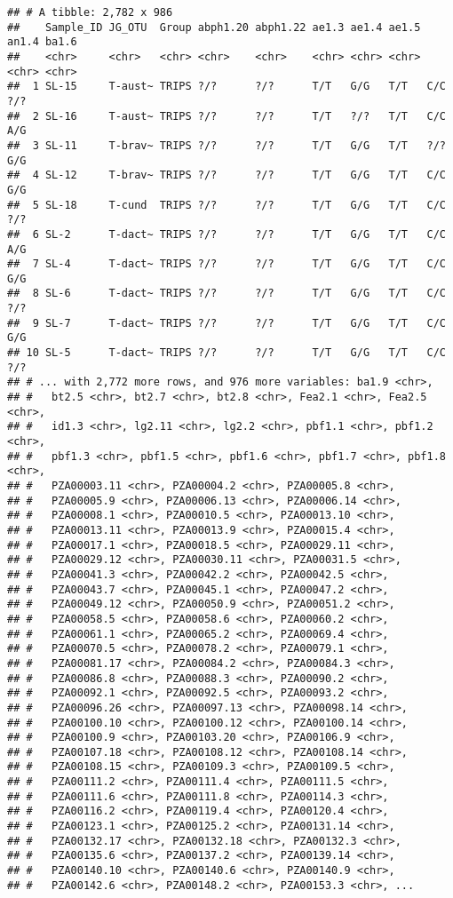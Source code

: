 \documentclass[]{article}
\begin{document}
\begin{verbatim}
## # A tibble: 2,782 x 986
##    Sample_ID JG_OTU  Group abph1.20 abph1.22 ae1.3 ae1.4 ae1.5 an1.4 ba1.6
##    <chr>     <chr>   <chr> <chr>    <chr>    <chr> <chr> <chr> <chr> <chr>
##  1 SL-15     T-aust~ TRIPS ?/?      ?/?      T/T   G/G   T/T   C/C   ?/?  
##  2 SL-16     T-aust~ TRIPS ?/?      ?/?      T/T   ?/?   T/T   C/C   A/G  
##  3 SL-11     T-brav~ TRIPS ?/?      ?/?      T/T   G/G   T/T   ?/?   G/G  
##  4 SL-12     T-brav~ TRIPS ?/?      ?/?      T/T   G/G   T/T   C/C   G/G  
##  5 SL-18     T-cund  TRIPS ?/?      ?/?      T/T   G/G   T/T   C/C   ?/?  
##  6 SL-2      T-dact~ TRIPS ?/?      ?/?      T/T   G/G   T/T   C/C   A/G  
##  7 SL-4      T-dact~ TRIPS ?/?      ?/?      T/T   G/G   T/T   C/C   G/G  
##  8 SL-6      T-dact~ TRIPS ?/?      ?/?      T/T   G/G   T/T   C/C   ?/?  
##  9 SL-7      T-dact~ TRIPS ?/?      ?/?      T/T   G/G   T/T   C/C   G/G  
## 10 SL-5      T-dact~ TRIPS ?/?      ?/?      T/T   G/G   T/T   C/C   ?/?  
## # ... with 2,772 more rows, and 976 more variables: ba1.9 <chr>,
## #   bt2.5 <chr>, bt2.7 <chr>, bt2.8 <chr>, Fea2.1 <chr>, Fea2.5 <chr>,
## #   id1.3 <chr>, lg2.11 <chr>, lg2.2 <chr>, pbf1.1 <chr>, pbf1.2 <chr>,
## #   pbf1.3 <chr>, pbf1.5 <chr>, pbf1.6 <chr>, pbf1.7 <chr>, pbf1.8 <chr>,
## #   PZA00003.11 <chr>, PZA00004.2 <chr>, PZA00005.8 <chr>,
## #   PZA00005.9 <chr>, PZA00006.13 <chr>, PZA00006.14 <chr>,
## #   PZA00008.1 <chr>, PZA00010.5 <chr>, PZA00013.10 <chr>,
## #   PZA00013.11 <chr>, PZA00013.9 <chr>, PZA00015.4 <chr>,
## #   PZA00017.1 <chr>, PZA00018.5 <chr>, PZA00029.11 <chr>,
## #   PZA00029.12 <chr>, PZA00030.11 <chr>, PZA00031.5 <chr>,
## #   PZA00041.3 <chr>, PZA00042.2 <chr>, PZA00042.5 <chr>,
## #   PZA00043.7 <chr>, PZA00045.1 <chr>, PZA00047.2 <chr>,
## #   PZA00049.12 <chr>, PZA00050.9 <chr>, PZA00051.2 <chr>,
## #   PZA00058.5 <chr>, PZA00058.6 <chr>, PZA00060.2 <chr>,
## #   PZA00061.1 <chr>, PZA00065.2 <chr>, PZA00069.4 <chr>,
## #   PZA00070.5 <chr>, PZA00078.2 <chr>, PZA00079.1 <chr>,
## #   PZA00081.17 <chr>, PZA00084.2 <chr>, PZA00084.3 <chr>,
## #   PZA00086.8 <chr>, PZA00088.3 <chr>, PZA00090.2 <chr>,
## #   PZA00092.1 <chr>, PZA00092.5 <chr>, PZA00093.2 <chr>,
## #   PZA00096.26 <chr>, PZA00097.13 <chr>, PZA00098.14 <chr>,
## #   PZA00100.10 <chr>, PZA00100.12 <chr>, PZA00100.14 <chr>,
## #   PZA00100.9 <chr>, PZA00103.20 <chr>, PZA00106.9 <chr>,
## #   PZA00107.18 <chr>, PZA00108.12 <chr>, PZA00108.14 <chr>,
## #   PZA00108.15 <chr>, PZA00109.3 <chr>, PZA00109.5 <chr>,
## #   PZA00111.2 <chr>, PZA00111.4 <chr>, PZA00111.5 <chr>,
## #   PZA00111.6 <chr>, PZA00111.8 <chr>, PZA00114.3 <chr>,
## #   PZA00116.2 <chr>, PZA00119.4 <chr>, PZA00120.4 <chr>,
## #   PZA00123.1 <chr>, PZA00125.2 <chr>, PZA00131.14 <chr>,
## #   PZA00132.17 <chr>, PZA00132.18 <chr>, PZA00132.3 <chr>,
## #   PZA00135.6 <chr>, PZA00137.2 <chr>, PZA00139.14 <chr>,
## #   PZA00140.10 <chr>, PZA00140.6 <chr>, PZA00140.9 <chr>,
## #   PZA00142.6 <chr>, PZA00148.2 <chr>, PZA00153.3 <chr>, ...
\end{verbatim}
\end{document}
